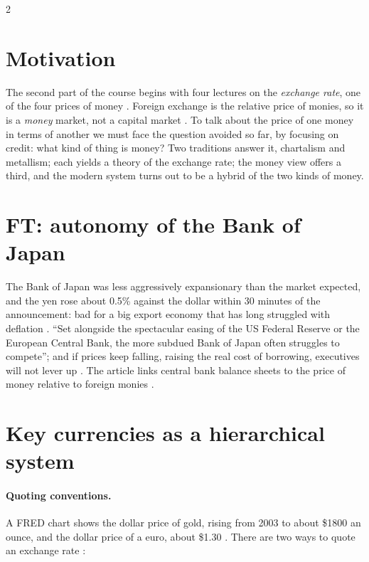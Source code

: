 \begin{paracol}{2}
\section*{Motivation}
The second part of the course begins with four lectures on the \emph{exchange rate}, one of the four prices of money . Foreign exchange is
the relative price of monies, so it is a \emph{money} market, not a capital market . To talk about the price of one money in terms of another
we must face the question avoided so far, by focusing on credit: what kind of thing is money?  Two traditions answer it,
chartalism and metallism; each yields a theory of the exchange rate; the money view offers a third, and the modern system turns out to be a hybrid of the
two kinds of money.

\section{FT: autonomy of the Bank of Japan}\label{sec:cm-ft}

\begin{casestudy}
The Bank of Japan was less aggressively expansionary than the market expected, and the yen rose about 0.5\% against the dollar within 30 minutes of the
announcement: bad for a big export economy that has long struggled with deflation . ``Set alongside the
spectacular easing of the US Federal Reserve or the European Central Bank, the more subdued Bank of Japan often struggles to compete''; and if prices keep
falling, raising the real cost of borrowing, executives will not lever up . The article links central bank balance sheets to the price of
money relative to foreign monies .
\end{casestudy}

\section{Key currencies as a hierarchical system}\label{sec:cm-hierarchy}

\paragraph{Quoting conventions.} A FRED chart shows the dollar price of gold, rising from 2003 to about \$1800 an ounce, and the dollar price of a euro, about
\$1.30 . There are two ways to quote an exchange rate :


\end{paracol}
